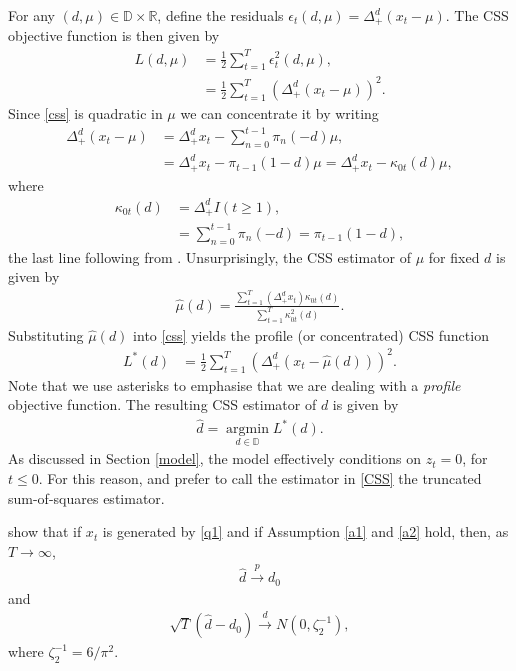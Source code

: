 {{For any $(d, \mu) \in \mathbb{D} \times \mathbb{R}$, define the residuals $\epsilon_t (d, \mu) =  \Delta_{+}^{d} (x_t- \mu )$. The CSS objective function is then given by
\begin{align}
  L (d, \mu) &= \frac{1}{2} \sum_{t = 1}^T \epsilon^2_t (d, \mu),  \nonumber \\
             &= \frac{1}{2} \sum_{t = 1}^T \left(  \Delta_{+}^{d} (x_t- \mu ) \right)^2. \label{css}
\end{align}
Since \eqref{css} is quadratic in $\mu$ we can concentrate it by writing
\begin{align*}
    \Delta_{+}^{d} (x_t-\mu ) &= \Delta_{+}^{d} x_t - \sum_{n = 0}^{t-1} \pi_n(-d) \mu, \\
    &= \Delta_{+}^{d} x_t - \pi_{t-1}(1-d) \mu = \Delta_{+}^{d} x_t - \kappa_{0t}(d)\mu,
\end{align*}
where 
\begin{align}
    \kappa_{0t}(d) &= \Delta_{+}^{d} I(t \geq 1), \nonumber\\
                   &=  \sum_{n = 0}^{t-1} \pi_n(-d) = \pi_{t-1}(1-d), \label{definitionkappa}
\end{align}
the last line following from \textcite[Lemma A.4]{johansen2016role}.  Unsurprisingly, the CSS estimator of $\mu$ for fixed $d$ is given by
\begin{align}
    \hat{\mu}(d) = \frac{\sum_{t = 1}^T (\Delta_{+}^{d} x_t)\kappa_{0t}(d)}{\sum_{t = 1}^T \kappa^2_{0t}(d)}. \label{mu1}
\end{align}
Substituting $\hat \mu (d)$ into \eqref{css} yields the profile (or concentrated) CSS function
\begin{align}
     L^*(d) &= \frac{1}{2} \sum_{t = 1}^T \left(  \Delta_{+}^{d} (x_t-\hat{\mu}(d) ) \right)^2 . \label{likstar}
\end{align}
Note that we use asterisks to emphasise that we are dealing with a \textit{profile} objective function. The resulting CSS estimator of $d$ is given by
\begin{align}
    \hat{d} = \operatorname*{argmin}_{d \in \mathbb{D}}  L^*(d). \label{CSS}
\end{align}
As discussed in Section \ref{model}, the model effectively conditions on $z_t = 0$, for $t \leq 0$. For this reason, \textcite{hualde2011gaussian} and \textcite{hualde2020truncated} prefer to call the estimator in \eqref{CSS} the truncated sum-of-squares estimator.

\textcite[Theorem 1 and Theorem 2]{hualde2020truncated} show that if $x_t$ is generated by \eqref{q1} and if Assumption \ref{a1} and \ref{a2} hold, then, as $T \rightarrow \infty$, 
\begin{align}
    \hat{d} \xrightarrow{p} d_0
\end{align}
and
\begin{align}
    \sqrt{T}(\hat{d} - d_0) \xrightarrow{d} N(0,\zeta^{-1}_2), \label{hndis}
\end{align}
where $\zeta^{-1}_2 = 6/\pi^2$.

}}
